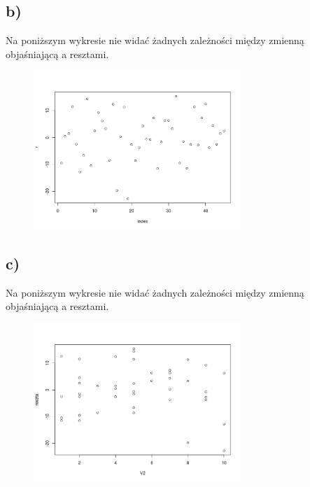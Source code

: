 \documentclass[9pt]{article}  %
\begin{document}
  \subsection{b)}
  Na poniższym wykresie nie widać żadnych zależności między zmienną objaśniającą a resztami.
      \begin{figure}[H]
      \centering
      \includegraphics[width=0.7\textwidth]{5c.png}
      \caption {}
    \end{figure} 
    
  \subsection{c)}

    Na poniższym wykresie nie widać żadnych zależności między zmienną objaśniającą a resztami.
      \begin{figure}[H]
      \centering
      \includegraphics[width=0.7\textwidth]{5b.png}
      \caption {}
    \end{figure} 
\end{document}
